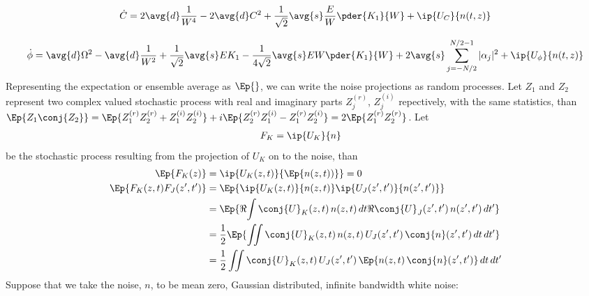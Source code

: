\begin{equation}
\begin{split}
\dot{C} &= 2 \avg{d} \frac{1}{W^4}  - 2 \avg{d} C^2 + \frac{1}{\sqrt{2}}\avg{s} \frac{E}{W} \pder{K_1}{W} + \ip{U_C}{ n(t,z)}\\
\end{split}
\end{equation}

\begin{equation}
\begin{split}
\dot{\phi} &= \avg{d} \Omega^2 - \avg{d} \frac{1}{W^2} + \frac{1}{\sqrt{2}} \avg{s} E K_1 - \frac{1}{4\sqrt{2}} \avg{s} EW \pder{K_1}{W} + 2\avg{s}  \sum_{j=-N/2}^{N/2 - 1} |\alpha_j|^2 + \ip{U_{\phi}}{n(t,z)} \\
\end{split}
\end{equation}
Representing the expectation or ensemble average as $\Ep{}$, we can write the noise projections as random processes.
Let $Z_1$ and $Z_2$ represent two complex valued stochastic process with real and imaginary parts $Z_j^{(r)}$, $Z_j^{(i)}$ repectively, with the same statistics, 
than $\Ep{Z_1\conj{Z_2}} = \Ep{Z_1^{(r)}Z_2^{(r)} + Z_1^{(i)}Z_2^{(i)}} + i\Ep{Z_2^{(r)}Z_1^{(i)} - Z_1^{(r)}Z_2^{(i)}} = 2 \Ep{Z_1^{(r)}Z_2^{(r)}} $.
Let 
\begin{equation}
\begin{split}
F_K &= \ip{U_K}{n} 
\end{split}
\end{equation}
be the stochastic process resulting from the projection of $U_K$ on to the noise, than 
\begin{equation}
\begin{split}
\Ep{F_K(z)} &= \ip{U_K(z,t)}{\Ep{n(z,t))}} = 0 \\
\Ep{F_K(z,t) F_J(z',t')} &= \Ep{\ip{U_K(z,t)}{n(z,t)} \ip{U_J(z',t')}{n(z',t')} } \\
 & = \Ep{\Re{\int \conj{U}_K(z,t) \,n(z,t) \,dt}\Re{\conj{U}_J(z',t')\, n(z',t')\,dt'} }\\
 & =  \frac{1}{2} \Ep{\iint \conj{U}_K(z,t)\, n(z,t)\, U_J(z',t')\, \conj{n}(z',t') \,dt\,dt'}\\
 & =  \frac{1}{2} \iint \conj{U}_K(z,t)\, U_J(z',t')\,\Ep{n(z,t)\, \conj{n}(z',t')} \,dt\,dt'\\
\end{split}
\end{equation}
 Suppose that we take the noise, $n$, to be mean zero, Gaussian distributed, infinite bandwidth white noise:
